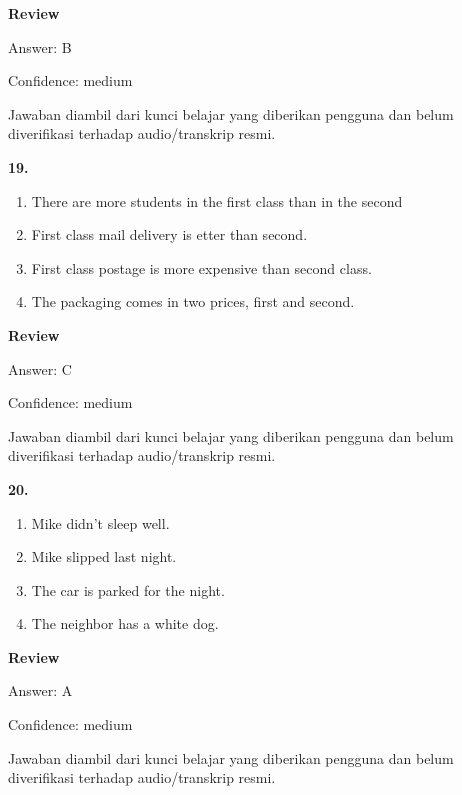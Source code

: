 \documentclass[12pt]{article}
\begin{document}
\par
\begingroup
\setlength{\parskip}{0pt}
\setlength{\parindent}{0pt}
\textbf{Review}\par
Answer: B\par
Confidence: medium\par
Jawaban diambil dari kunci belajar yang diberikan pengguna dan belum diverifikasi terhadap audio/transkrip resmi.\par
\endgroup
\par
\vspace{0.25\baselineskip}
\noindent\textbf{19.}
\begin{enumerate}[label=(\Alph*),leftmargin=*,itemsep=0.2em]
\item There are more students in the first class than in the second
\item First class mail delivery is etter than second.
\item First class postage is more expensive than second class.
\item The packaging comes in two prices, first and second.
\end{enumerate}
\par
\begingroup
\setlength{\parskip}{0pt}
\setlength{\parindent}{0pt}
\textbf{Review}\par
Answer: C\par
Confidence: medium\par
Jawaban diambil dari kunci belajar yang diberikan pengguna dan belum diverifikasi terhadap audio/transkrip resmi.\par
\endgroup
\par
\vspace{0.25\baselineskip}
\noindent\textbf{20.}
\begin{enumerate}[label=(\Alph*),leftmargin=*,itemsep=0.2em]
\item Mike didn't sleep well.
\item Mike slipped last night.
\item The car is parked for the night.
\item The neighbor has a white dog.
\end{enumerate}
\par
\begingroup
\setlength{\parskip}{0pt}
\setlength{\parindent}{0pt}
\textbf{Review}\par
Answer: A\par
Confidence: medium\par
Jawaban diambil dari kunci belajar yang diberikan pengguna dan belum diverifikasi terhadap audio/transkrip resmi.\par
\end{document}
